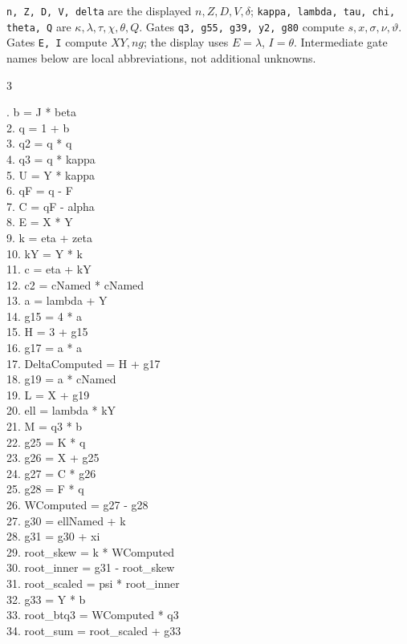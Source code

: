 \documentclass[10pt]{article}
\begin{document}
\texttt{n, Z, D, V, delta} are the displayed
$n,Z,D,V,\delta$; \texttt{kappa, lambda, tau, chi, theta, Q}
are $\kappa,\lambda,\tau,\chi,\theta,Q$. Gates \texttt{q3, g55, g39, y2, g80} compute $s,x,\sigma,\nu,\vartheta$. Gates \texttt{E, I} compute
$XY,ng$; the display uses $E=\lambda$, $I=\theta$. Intermediate gate
names below are local abbreviations, not additional unknowns.
\begin{multicols}{3}
\raggedright\ttfamily\fontsize{7.2}{8.4}. b = J * beta\\
2. q = 1 + b\\
3. q2 = q * q\\
4. q3 = q * kappa\\
5. U = Y * kappa\\
6. qF = q - F\\
7. C = qF - alpha\\
8. E = X * Y\\
9. k = eta + zeta\\
10. kY = Y * k\\
11. c = eta + kY\\
12. c2 = cNamed * cNamed\\
13. a = lambda + Y\\
14. g15 = 4 * a\\
15. H = 3 + g15\\
16. g17 = a * a\\
17. DeltaComputed = H + g17\\
18. g19 = a * cNamed\\
19. L = X + g19\\
20. ell = lambda * kY\\
21. M = q3 * b\\
22. g25 = K * q\\
23. g26 = X + g25\\
24. g27 = C * g26\\
25. g28 = F * q\\
26. WComputed = g27 - g28\\
27. g30 = ellNamed + k\\
28. g31 = g30 + xi\\
29. root\_skew = k * WComputed\\
30. root\_inner = g31 - root\_skew\\
31. root\_scaled = psi * root\_inner\\
32. g33 = Y * b\\
33. root\_btq3 = WComputed * q3\\
34. root\_sum = root\_scaled + g33\\

\end{multicols}
\end{document}
